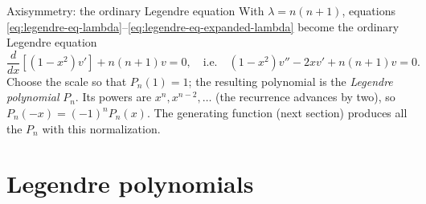 \documentclass[11pt]{beamer}
\begin{document}
\begin{frame}[allowframebreaks=1.00]{Axisymmetry: the ordinary Legendre equation}
With $\lambda=n(n+1)$, equations \eqref{eq:legendre-eq-lambda}--\eqref{eq:legendre-eq-expanded-lambda}
become the ordinary Legendre equation
\begin{equation}
  \frac{d}{dx}\left[(1-x^2)v'\right]+n(n+1)v=0,
  \quad\text{i.e.}\quad
  (1-x^2)v''-2xv'+n(n+1)v=0.
  \label{eq:legendre-eq}
\end{equation}
Choose the scale so that $P_n(1)=1$; the resulting polynomial is the
\emph{Legendre polynomial} $P_n$. Its powers are $x^n,x^{n-2},\ldots$ (the recurrence
advances by two), so $P_n(-x)=(-1)^nP_n(x)$.
The generating function (next section) produces all the $P_n$ with this normalization.
\end{frame}

\section{Legendre polynomials}
\end{document}
